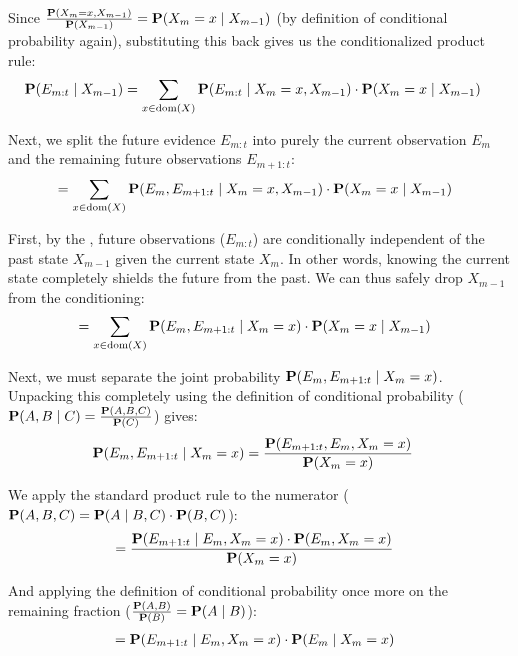 Since $\frac{\textbf{P}(X_m = x, X_{m-1})}{\textbf{P}(X_{m-1})} = \textbf{P}(X_m = x \mid X_{m-1})$ (by definition of conditional probability again), substituting this back gives us the conditionalized product rule:
\begin{align*}
\textbf{P}(E_{m:t} \mid X_{m-1}) &= \sum_{x \in \text{dom}(X)} \textbf{P}(E_{m:t} \mid X_m = x, X_{m-1}) \cdot \textbf{P}(X_m = x \mid X_{m-1})
\end{align*}

Next, we split the future evidence $E_{m:t}$ into purely the current observation $E_m$ and the remaining future observations $E_{m+1:t}$:
\begin{align*}
&= \sum_{x \in \text{dom}(X)} \textbf{P}(E_m, E_{m+1:t} \mid X_m = x, X_{m-1}) \cdot \textbf{P}(X_m = x \mid X_{m-1})
\end{align*}

First, by the , future observations ($E_{m:t}$) are conditionally independent of the past state $X_{m-1}$ given the current state $X_m$. In other words, knowing the current state completely shields the future from the past. We can thus safely drop $X_{m-1}$ from the conditioning:
\begin{align*}
&= \sum_{x \in \text{dom}(X)} \textbf{P}(E_m, E_{m+1:t} \mid X_m = x) \cdot \textbf{P}(X_m = x \mid X_{m-1})
\end{align*}

Next, we must separate the joint probability $\textbf{P}(E_m, E_{m+1:t} \mid X_m = x)$. Unpacking this completely using the definition of conditional probability ($\textbf{P}(A, B \mid C) = \frac{\textbf{P}(A, B, C)}{\textbf{P}(C)}$) gives:
\begin{align*}
\textbf{P}(E_m, E_{m+1:t} \mid X_m = x) &= \frac{\textbf{P}(E_{m+1:t}, E_m, X_m = x)}{\textbf{P}(X_m = x)}
\end{align*}

We apply the standard product rule to the numerator ($\textbf{P}(A, B, C) = \textbf{P}(A \mid B, C) \cdot \textbf{P}(B, C)$):
\begin{align*}
&= \frac{\textbf{P}(E_{m+1:t} \mid E_m, X_m = x) \cdot \textbf{P}(E_m, X_m = x)}{\textbf{P}(X_m = x)}
\end{align*}

And applying the definition of conditional probability once more on the remaining fraction ($\frac{\textbf{P}(A, B)}{\textbf{P}(B)} = \textbf{P}(A \mid B)$):
\begin{align*}
&= \textbf{P}(E_{m+1:t} \mid E_m, X_m = x) \cdot \textbf{P}(E_m \mid X_m = x)
\end{align*}

